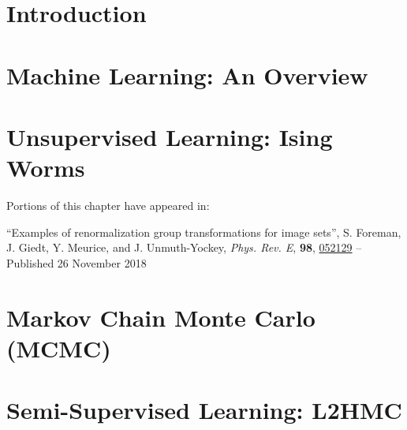\documentclass[10pt,notitlepage]{report}
\begin{document}
\begin{doublespace}

\chapter{Introduction}%
\label{chap:introduction}


\chapter{Machine Learning: An Overview}%
\label{chap:machine_learning}

\chapter{Unsupervised Learning: Ising Worms}%
\label{chap:unsupervised_learning}
Portions of this chapter have appeared in:
\begin{center}
  ``Examples of renormalization group transformations for image sets'', S.
  Foreman, J. Giedt, Y. Meurice, and J. Unmuth-Yockey, \textit{Phys. Rev. E},
  \textbf{98},
  \href{https://journals.aps.org/pre/abstract/10.1103/PhysRevE.98.052129}{052129}
  -- Published 26 November 2018
\end{center}


%
\chapter{Markov Chain Monte Carlo (MCMC)}%
\label{chap:mcmc}


\chapter{Semi-Supervised Learning: L2HMC}%
\label{chap:l2hmc}


% 
% 
% 

% 
% 
% 

% 
\end{doublespace}
\end{document}
